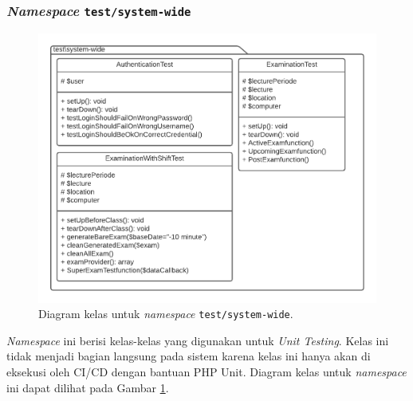 \subsubsection{\textit{Namespace} \texttt{test/system-wide}}
    \begin{figure}
        \centering
        \includegraphics[width=0.7\paperwidth]{Gambar/classmap-be/Classmap - test-systemwide.pdf}
        \caption{Diagram kelas untuk \textit{namespace}
        \texttt{test/system-wide}.}
        \label{fig:classmap_test-systemwide}
    \end{figure}
    \textit{Namespace} ini berisi kelas-kelas yang digunakan untuk \textit{Unit
    Testing}. Kelas ini tidak menjadi bagian langsung pada sistem karena kelas
    ini hanya akan di eksekusi oleh CI/CD dengan bantuan PHP Unit. Diagram kelas
    untuk \textit{namespace} ini dapat dilihat pada Gambar
    \ref{fig:classmap_test-systemwide}.
    
